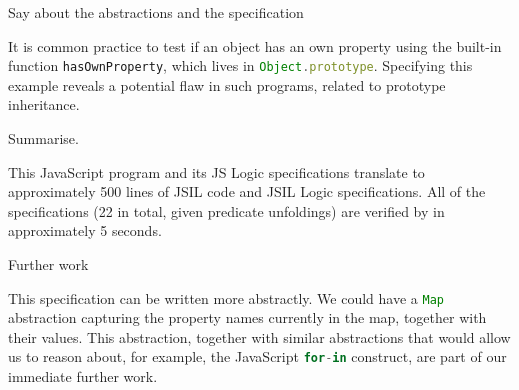 \documentclass{llncs}
\newcommand{\polish}[1]{{\color{red}#1}}
\def\jsinline{\lstinline[language=JavaScript, basicstyle=\small]}
\begin{document}
\polish{Say about the abstractions and the specification}

It is common practice to test if an object has an own property using the built-in function \jsinline|hasOwnProperty|, which lives in \jsinline|Object.prototype|. Specifying this example reveals a potential flaw in such programs, related to prototype inheritance.

\polish{Summarise.}

This JavaScript program and its JS Logic specifications translate to approximately 500 lines of JSIL code and JSIL Logic specifications. All of the specifications (22 in total, given predicate unfoldings) are verified by \javert in approximately 5 seconds. 

\begin{display}{Further work}
\ \ \begin{minipage}{0.97\textwidth}
This specification can be written more abstractly. We could have a \jsinline|Map| abstraction capturing the property names currently in the map, together with their values. This abstraction, together with similar abstractions that would allow us to reason about, for example, the JavaScript \jsinline|for-in| construct, are part of our immediate further work.
\end{minipage}
\end{display}
\end{document}
